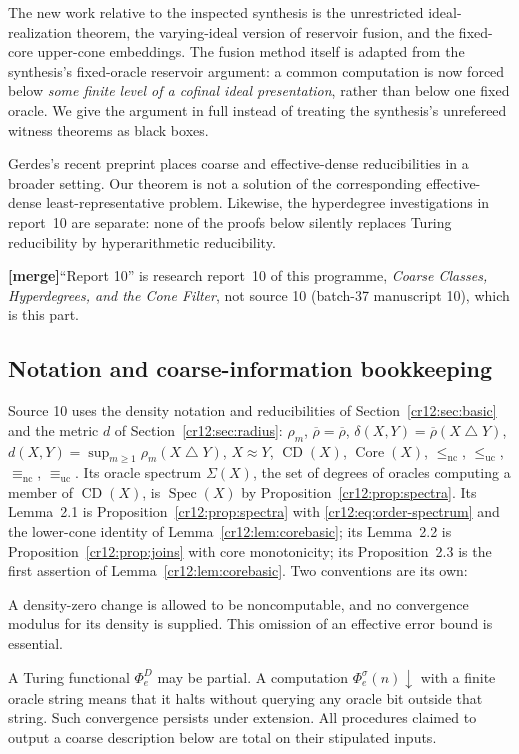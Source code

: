 \documentclass[11pt,letterpaper]{article}
\theoremstyle{plain}
\theoremstyle{definition}
\theoremstyle{remark}
\numberwithin{equation}{section}
\newcommand{\leuc}{\leq_{\mathrm{uc}}}
\newcommand{\lenc}{\leq_{\mathrm{nc}}}
\newcommand{\equc}{\equiv_{\mathrm{uc}}}
\newcommand{\eqnc}{\equiv_{\mathrm{nc}}}
\newcommand{\Core}{\operatorname{Core}}
\newcommand{\CD}{\operatorname{CD}}
\newcommand{\Spec}{\operatorname{Spec}}
\newcommand{\sd}{\mathbin{\triangle}}
\newcommand{\Dens}{\overline\rho}
\newcommand{\mergenote}[1]{\par\smallskip\noindent
 {\small\textsf{\textbf{[merge]}}\enspace #1}\par\smallskip}
\begin{document}
The new work relative to the inspected synthesis is the unrestricted ideal-realization
theorem, the varying-ideal version of reservoir fusion, and the fixed-core upper-cone
embeddings. The fusion method itself is adapted from the synthesis's fixed-oracle
reservoir argument: a common computation is now forced below \emph{some finite level of
a cofinal ideal presentation}, rather than below one fixed oracle. We give the
argument in full instead of treating the synthesis's unrefereed witness theorems as
black boxes.

Gerdes's recent preprint \cite{Gerdes} places coarse and effective-dense reducibilities
in a broader setting. Our theorem is not a solution of the corresponding
effective-dense least-representative problem. Likewise, the hyperdegree
investigations in report~10 \cite{RepoHyper} are separate: none of the proofs below
silently replaces Turing reducibility by hyperarithmetic reducibility.

\mergenote{``Report 10'' is research report~10 of this programme, \emph{Coarse Classes,
Hyperdegrees, and the Cone Filter}, not source 10 (batch-37 manuscript 10), which is
this part.}

\subsection{Notation and coarse-information bookkeeping}
Source 10 uses the density notation and reducibilities of Section~\ref{cr12:sec:basic}
and the metric $d$ of Section~\ref{cr12:sec:radius}: $\rho_m$, $\overline\rho=\Dens$,
$\delta(X,Y)=\overline\rho(X\sd Y)$, $d(X,Y)=\sup_{m\ge1}\rho_m(X\sd Y)$, $X\approx Y$,
$\CD(X)$, $\Core(X)$, $\lenc$, $\leuc$, $\eqnc$, $\equc$. Its oracle spectrum
$\Sigma(X)$, the set of degrees of oracles computing a member of $\CD(X)$, is
$\Spec(X)$ by Proposition~\ref{cr12:prop:spectra}. Its Lemma~2.1 is
Proposition~\ref{cr12:prop:spectra} with \eqref{cr12:eq:order-spectrum} and the
lower-cone identity of Lemma~\ref{cr12:lem:corebasic}; its Lemma~2.2 is
Proposition~\ref{cr12:prop:joins} with core monotonicity; its Proposition~2.3 is the
first assertion of Lemma~\ref{cr12:lem:corebasic}. Two conventions are its own:

A density-zero change is allowed to be noncomputable, and no convergence modulus for
its density is supplied. This omission of an effective error bound is essential.

A Turing functional $\Phi_e^D$ may be partial. A computation
$\Phi_e^\sigma(n)\downarrow$ with a finite oracle string means that it halts without
querying any oracle bit outside that string. Such convergence persists under
extension. All procedures claimed to output a coarse description below are total on
their stipulated inputs.
\end{document}
